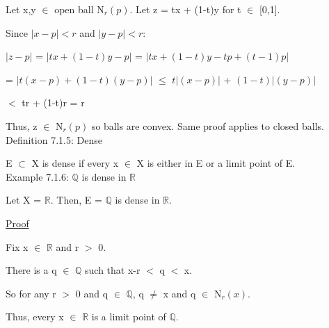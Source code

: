 	Let x,y $\in$ open ball N$_r(p)$. Let z = tx + (1-t)y for t $\in$ [0,1].
	
	Since $|x - p| < r$ and $|y - p| < r$:

	\hspace{1cm} $|z - p|$ = $|tx + (1-t)y - p|$ = $|tx + (1-t)y - tp + (t-1)p|$

	\hspace{2.3cm} = $|t(x-p) + (1-t)(y-p)|$ $\leq$ $t|(x-p)|$ + $(1-t)|(y-p)|$

	\hspace{2.3cm} $<$ tr + (1-t)r = r

	Thus, z $\in$ N$_r(p)$ so balls are convex. Same proof applies to closed balls. \\

{ \color{blue} Definition 7.1.5: Dense } 

	\begin{adjustbox}{minipage=14cm, right, vspace=0.1cm 0cm}
		E $\subset$ X is dense if every x $\in$ X is either in E or
		a limit point of E. \\
	\end{adjustbox}

{ \color{purple} Example 7.1.6: $\mathbb{Q}$ is dense in $\mathbb{R}$ } 

	\qquad Let X = $\mathbb{R}$.
	Then, E = $\mathbb{Q}$ is dense in $\mathbb{R}$.

{ \color{magenta} \underline{Proof} } 

	Fix x $\in$ $\mathbb{R}$ and r $>$ 0.

	There is a q $\in$ $\mathbb{Q}$ such that x-r $<$ q $<$ x.

	So for any r $>$ 0 and q $\in$ $\mathbb{Q}$, q $\neq$ x and
	q $\in$ N$_r(x)$.

	Thus, every x $\in$ $\mathbb{R}$ is a limit point of $\mathbb{Q}$. \\





































